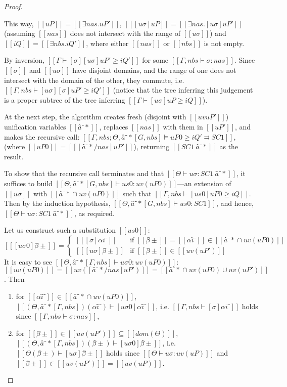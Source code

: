 \begin{proof}
\begin{caseof}
            This way, $[[uP]] = [[∃nas.uP']]$, $[[ [uσ]uP ]] = [[ ∃nas.[uσ]uP' ]]$ 
            (assuming $[[nas]]$ does not intersect with the range of $[[uσ]]$)
            and $[[iQ]] = [[ ∃nbs.iQ' ]]$, where either $[[nas]]$ or $[[nbs]]$ is not empty.

            By inversion, $[[ Γ ⊢ [σ][uσ]uP' ≥ iQ' ]]$ for some $[[Γ, nbs ⊢ σ : nas]]$.
            Since $[[σ]]$ and $[[uσ]]$ have disjoint domains,
            and the range of one does not intersect with the domain of the other,
            they commute, i.e. $[[ Γ, nbs ⊢ [uσ][σ]uP' ≥ iQ' ]]$
            (notice that the tree inferring this judgement is 
            a proper subtree of the tree inferring 
            $[[ Γ ⊢ [uσ]uP ≥ iQ ]]$).

            At the next step, 
            the algorithm creates fresh (disjoint with $[[uv uP']]$) 
            unification variables $[[â⁻*]]$, replaces $[[nas]]$ with them in $[[ uP' ]]$,
            and makes the recursive call:
            $[[Γ, nbs; Θ, â⁻*[G, nbs] ⊨ uP0 ≥ iQ' ⫤ SC1]]$,
            (where $[[uP0]] = [[ [â⁻*/nas]uP' ]]$),
            returning $[[SC1 \ {â⁻*}]]$ as the result.

            To show that the recursive call terminates and that 
            $[[ Θ ⊢ uσ : SC1 \ {â⁻*} ]]$,
            it suffices to build $[[Θ, â⁻*[G, nbs] ⊢ us0 : uv(uP0)]]$---an extension of $[[uσ]]$ with
            $[[{â⁻*} ∩ uv(uP0)]]$ such that $[[Γ, nbs ⊢ [us0]uP0 ≥ iQ]]$.
            Then by the induction hypothesis, $[[Θ, â⁻*[G, nbs] ⊢ us0 : SC1]]$,
            and hence, $[[ Θ  ⊢ uσ : SC1 \ {â⁻*} ]]$, as required.

            Let us construct such a substitution $[[us0]]$:
                \[
                    [[ [uσ0]β̂± ]]  = 
                    \begin{cases}
                    [[ [σ]αi⁻ ]] & \text{if } [[β̂±]] = [[αî⁻]] \in [[{â⁻*} ∩ uv(uP0)]] \\
                    [[ [uσ]β̂± ]] & \text{if } [[β̂±]] \in [[ uv(uP') ]]
                    \end{cases}
            \]
            It is easy to see $[[Θ, â⁻*[Γ, nbs] ⊢ uσ0 : uv(uP0)]]$:
            $[[uv(uP0)]] = [[ uv([â⁻*/nas]uP') ]] = [[{â⁻*} ∩ uv(uP0) ∪ uv(uP')]]$. Then
            \begin{enumerate}
                    \item for $[[αî⁻]] \in [[{â⁻*} ∩ uv(uP0)]]$, $[[ (Θ, â⁻*[Γ, nbs])(αî⁻) ⊢ [uσ0] αî⁻]]$, 
                    i.e. $[[ Γ, nbs ⊢ [σ]αi⁻ ]]$ holds since $[[Γ, nbs ⊢ σ : nas]]$,
                    \item for $[[β̂±]] \in [[ uv(uP') ]] \subseteq [[dom(Θ)]]$, $[[ (Θ, â⁻*[Γ, nbs])(β̂±) ⊢ [uσ0] β̂± ]]$,
                    i.e. $[[Θ(β̂±) ⊢ [uσ] β̂± ]]$ holds since $[[Θ ⊢ uσ : uv(uP)]]$ and $[[β̂±]] \in [[ uv(uP') ]] = [[uv(uP)]]$.
            \end{enumerate}


\end{caseof}
\end{proof}
